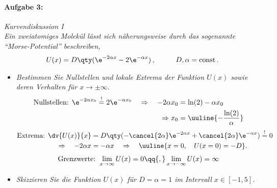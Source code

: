 \paragraph{Aufgabe 3: } \emph{Kurvendiskussion I}\\[0.2cm]
\emph{Ein zweiatomiges Molekül lässt sich näherungsweise durch das sogenannte ``Morse-Potential'' beschreiben,}
\begin{align*}
U(x)=D\qty(\e^{-2\alpha x}-2\e^{-\alpha x})\,, \hspace{1cm} D,\alpha=\operatorname{const}.
\end{align*}
\begin{itemize}
\item \emph{Bestimmen Sie Nullstellen und lokale Extrema der Funktion $U(x)$ sowie deren Verhalten für $x \to\pm\infty$.} 
\begin{align}
    \text{Nullstellen: } \e^{-2\alpha x_0} \overset{!}{=} 2 \e^{-\alpha x_0} \quad \Rightarrow \quad -2\alpha x_0 &= \ln(2) - \alpha x_0 \\
    \Rightarrow x_0 &= \uuline{-\frac{\ln(2)}{\alpha}} 
\end{align}
\begin{align}
    \text{Extrema: } \dv{U(x)}{x} &= D \qty(-\cancel{2\alpha} \e^{-2\alpha x} + \cancel{2\alpha} \e^{-\alpha x}) \overset{!}{=} 0 \\
    \Rightarrow \quad -2\alpha x &= -\alpha x \quad \Rightarrow \quad \uuline{x=0, \quad U(x=0) = -D}. 
\end{align}
\begin{align}
    \text{Grenzwerte: } \lim_{x\to \infty} U(x) = 0 \qq{,} \lim_{x\to -\infty} U(x) = \infty
\end{align}
\item \emph{Skizzieren Sie die Funktion $U(x)$ für $D=\alpha=1$ im Intervall $x\in[-1,5]$.}
\end{itemize}
\begin{figure}[htp]
    \centering
\end{figure}
%
\newpage
